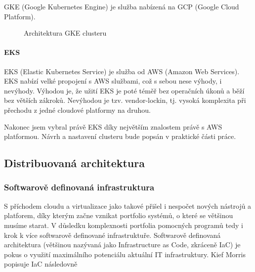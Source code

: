 \documentclass[thesis=M,czech]{FITthesis}[2019/12/23]
\theoremstyle{plain}
\theoremstyle{definition}
\begin{document}
GKE (Google Kubernetes Engine)\cite{gke} je služba nabízená na GCP (Google Cloud Platform). 



\begin{figure}[H]\centering
	

	\caption[Architektura GKE clusteru]{Architektura GKE clusteru}\label{fig:float}
\end{figure}
		
		

\paragraph{EKS}

EKS (Elastic Kubernetes Service)\cite{eks} je služba od AWS (Amazon Web Services). EKS nabízí velké propojení s AWS službami, což s sebou nese výhody, i nevýhody. Výhodou je, že užití EKS je poté téměř bez operačních úkonů a běží bez větších zákroků. Nevýhodou je tzv. vendor-lockin, tj. vysoká komplexita při přechodu z jedné cloudové platformy na druhou.



Nakonec jsem vybral právě EKS díky největším znalostem právě s AWS platformou. Návrh a nastavení clusteru bude popsán v praktické části práce. 








\subsection{Distribuovaná architektura}


\subsubsection{Softwarově definovaná infrastruktura}

S příchodem cloudu a virtualizace jako takové přišel i nespočet nových nástrojů a platforem, díky kterým začne vznikat portfolio systémů, o které se většinou musíme starat. V důsledku komplexnosti portfolia pomocných programů tedy i krok k více softwarově definované infrastruktuře. Softwarově definovaná architektura (většinou nazývaná jako Infrastructure as Code, zkráceně IaC) je pokus o využití maximálního potenciálu aktuální IT infrastruktury. Kief Morris \cite{kief-morris-iac} popisuje IaC následovně
\end{document}
